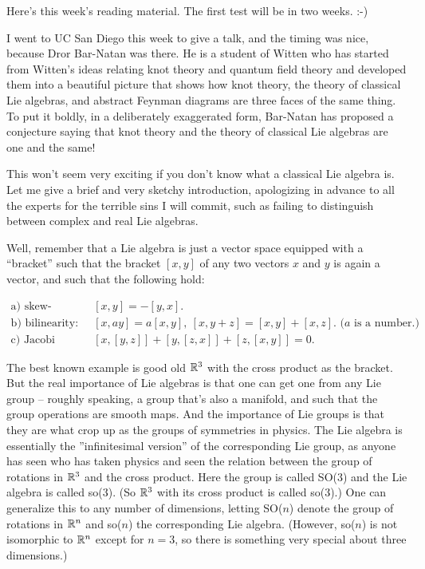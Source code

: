 
Here's this week's reading material.  The first test will be in two
weeks.  :-)


I went to UC San Diego this week to give a talk, and the timing was
nice, because Dror Bar-Natan was there.  He is a student of Witten who
has started from Witten's ideas relating knot theory and quantum field
theory and developed them into a beautiful picture that shows how knot
theory, the theory of classical Lie algebras, and abstract Feynman
diagrams are three faces of the same thing.  To put it boldly, in a
deliberately exaggerated form, Bar-Natan has proposed a conjecture
saying that knot theory and the theory of classical Lie algebras are
one and the same!  

This won't seem very exciting if you don't know what a classical Lie
algebra is.  Let me give a brief and very sketchy introduction,
apologizing in advance to all the experts for the terrible sins I will
commit, such as failing to distinguish between complex and real Lie
algebras. 

Well, remember that a Lie algebra is just a vector space
equipped with a ``bracket'' such that the bracket $[x,y]$ of any two vectors
$x$ and $y$ is again a vector, and such that the following hold:

\[\begin{array}{ll}
\text{a) skew-symmetry: }   & [x,y] = -[y,x].\\
\text{b) bilinearity: }     & [x,ay] = a[x,y], \ [x,y+z] = [x,y] + [x,z]\text{.  ($a$ is a number.)}\\
\text{c) Jacobi identity: } & [x,[y,z]] + [y,[z,x]] + [z,[x,y]] = 0.
\end{array}\]

The best known example is good old $\mathbb R^3$ with the cross product as the
bracket.  But the real importance of Lie algebras is that one can get
one from any Lie group -- roughly speaking, a group that's also a
manifold, and such that the group operations are smooth maps.  And the
importance of Lie groups is that they are what crop up as the groups of
symmetries in physics.  The Lie algebra is essentially the
''infinitesimal version'' of the corresponding Lie group, as anyone has
seen who has taken physics and seen the relation between the group of
rotations in $\mathbb R^3$ and the cross product.  Here the group is called SO(3)
and the Lie algebra is called so(3).  (So $\mathbb R^3$ with its cross product is
called so(3).)  One can generalize this to any number of dimensions,
letting SO($n$) denote the group of rotations in $\mathbb R^n$ and so($n$) the
corresponding Lie algebra.  (However, so($n$) is not isomorphic to $\mathbb R^n$
except for $n = 3$, so there is something very special about three
dimensions.)  

